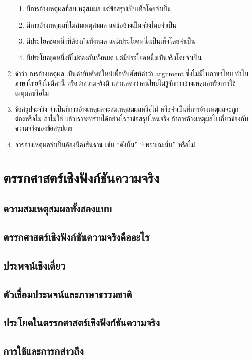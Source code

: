 \documentclass[a4paper,12pt]{extbook}
\theoremstyle{definition}
\theoremstyle{remark}
\newcommand{\q}[1]{``#1''}
\begin{document}
\begin{enumerate}
				\begin{enumerate}[label={\arabic*.}]
					\item มีการอ้างเหตุผลที่สมเหตุสมผล แต่ข้อสรุปเป็นเท็จโดยจำเป็น
					\item มีการอ้างเหตุผลที่ไม่สมเหตุสมผล แต่ข้ออ้างเป็นจริงโดยจำเป็น
					\item มีประโยคชุดหนึ่งที่ต้องกันทั้งหมด แต่มีประโยคหนึ่งเป็นเท็จโดยจำเป็น
					\item มีประโยคชุดหนึ่งที่ไม่ต้องกันทั้งหมด แต่มีประโยคหนึ่งเป็นจริงโดยจำเป็น
				\end{enumerate}
				\item คำว่า การอ้างเหตุผล เป็นคำทับศัพท์ใหม่เพื่อทับศัพท์คำว่า argument ซึ่งไม่มีในภาษาไทย ทำไมภาษาไทยจึงไม่มีคำนี้ หรือว่าความจริงมี แล้วแสดงว่าคนไทยไม่รู้จักการอ้างเหตุผลหรือการใช้เหตุผลหรือไม่
				\item ข้อสรุปจะจริง จำเป็นที่การอ้างเหตุผลจะสมเหตุสมผลหรือไม่ หรือจำเป็นที่การอ้างเหตุผลจะถูกต้องหรือไม่ ถ้าไม่ใช่ แล้วเราจะทราบได้อย่างไรว่าข้อสรุปไหนจริง ถ้าการอ้างเหตุผลไม่เกี่ยวข้องกับความจริงของข้อสรุปเลย
				\item การอ้างเหตุผลจำเป็นต้องมีคำสันธาน เช่น \q{ดังนั้น} \q{เพราะฉะนั้น} หรือไม่
			\end{enumerate}
		
	\chapter{ตรรกศาสตร์เชิงฟังก์ชันความจริง}
		\section{ความสมเหตุสมผลทั้งสองแบบ}
		\section{ตรรกศาสตร์เชิงฟังก์ชันความจริงคืออะไร}
		\section{ประพจน์เชิงเดี่ยว}
		\section{ตัวเชื่อมประพจน์และภาษาธรรมชาติ}
		\section{ประโยคในตรรกศาสตร์เชิงฟังก์ชันความจริง}
		\section{การใช้และการกล่าวถึง} %
\end{document}
